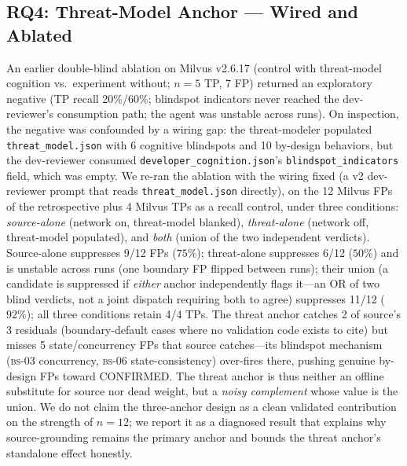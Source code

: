 \documentclass[sigconf]{acmart}
\begin{document}
\subsection{RQ4: Threat-Model Anchor --- Wired and Ablated}\label{sec:eval-tm}
An earlier double-blind ablation on Milvus v2.6.17 (control with threat-model cognition vs.\ experiment without; $n{=}5$ TP, 7 FP) returned an exploratory negative (TP recall 20\%/60\%; blindspot indicators never reached the dev-reviewer's consumption path; the agent was unstable across runs). On inspection, the negative was confounded by a wiring gap: the threat-modeler populated \texttt{threat\_model.json} with 6 cognitive blindspots and 10 by-design behaviors, but the dev-reviewer consumed \texttt{developer\_cognition.json}'s \texttt{blindspot\_indicators} field, which was empty. We re-ran the ablation with the wiring fixed (a v2 dev-reviewer prompt that reads \texttt{threat\_model.json} directly), on the 12 Milvus FPs of the retrospective plus 4 Milvus TPs as a recall control, under three conditions: \emph{source-alone} (network on, threat-model blanked), \emph{threat-alone} (network off, threat-model populated), and \emph{both} (union of the two independent verdicts). Source-alone suppresses 9/12 FPs ($75\%$); threat-alone suppresses 6/12 ($50\%$) and is unstable across runs (one boundary FP flipped between runs); their union (a candidate is suppressed if \emph{either} anchor independently flags it---an OR of two blind verdicts, not a joint dispatch requiring both to agree) suppresses 11/12 ($92\%$); all three conditions retain 4/4 TPs. The threat anchor catches 2 of source's 3 residuals (boundary-default cases where no validation code exists to cite) but misses 5 state/concurrency FPs that source catches---its blindspot mechanism (\textsc{bs-}03 concurrency, \textsc{bs-}06 state-consistency) over-fires there, pushing genuine by-design FPs toward CONFIRMED. The threat anchor is thus neither an offline substitute for source nor dead weight, but a \emph{noisy complement} whose value is the union. We do not claim the three-anchor design as a clean validated contribution on the strength of $n{=}12$; we report it as a diagnosed result that explains why source-grounding remains the primary anchor and bounds the threat anchor's standalone effect honestly.
\end{document}
